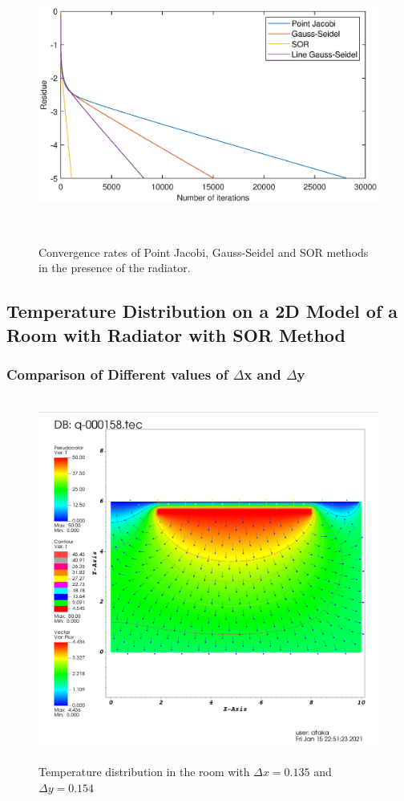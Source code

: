 \documentclass[letterpaper,12pt]{article}
\begin{document}
\begin{figure}[H] 
	\centering 
	\includegraphics[max height=9cm]{graphs/residual_SOR19_defaultrad.eps}
	\caption{Convergence rates of Point Jacobi, Gauss-Seidel and SOR methods in the presence of the radiator.}
 	\label{fig:convrad}
\end{figure}
\subsection{Temperature Distribution on a 2D Model of a Room with Radiator with SOR Method}
\subsubsection{Comparison of Different values of $\Delta$x and $\Delta$y}
\begin{figure}[H] 
	\centering 
	\includegraphics[max height=12cm]{graphs/imax75jmax40_default/imax75jmax40_default.png}
	\caption{Temperature distribution in the room with $\Delta x=0.135$ and $\Delta y = 0.154$}
 	\label{fig:7540}
\end{figure}
\end{document}
